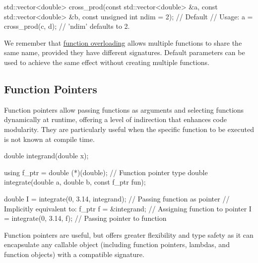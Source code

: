 \vspace{-0.5em}

\begin{codeblock}[language=C++, numbers=none]
std::vector<double> cross_prod(const std::vector<double> &a,
                               const std::vector<double> &b,
                               const unsigned int ndim = 2); // Default
// Usage:
a = cross_prod(c, d); // 'ndim' defaults to 2.
\end{codeblock}

\begin{observationblock}
    We remember that \hyperref[function-overloading]{function overloading} allows multiple functions to share the same name, provided they have different signatures. Default parameters can be used to achieve the same effect without creating multiple functions.
\end{observationblock}

\subsection{Function Pointers}

\vspace{-0.5em}

Function pointers allow passing functions as arguments and selecting functions dynamically at runtime, offering a level of indirection that enhances code modularity. They are particularly useful when the specific function to be executed is not known at compile time.

\vspace{-0.5em}

\begin{codeblock}[language=C++, numbers=none]
double integrand(double x);

using f_ptr = double (*)(double); // Function pointer type
double integrate(double a, double b, const f_ptr fun);

double I = integrate(0, 3.14, integrand); // Passing function as pointer
// Implicitly equivalent to:
f_ptr f = &integrand; // Assigning function to pointer
I = integrate(0, 3.14, f); // Passing pointer to function
\end{codeblock}

\vspace{-0.5em}

Function pointers are useful, but  offers greater flexibility and type safety as it can encapsulate any callable object (including function pointers, lambdas, and function objects) with a compatible signature.

